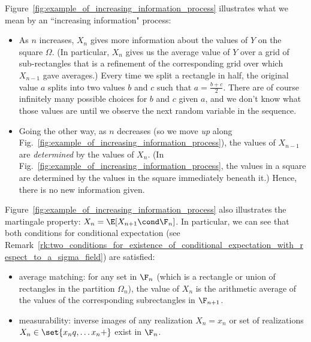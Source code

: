\documentclass{article} %
\begin{document}
\begin{remark}
Figure~\ref{fig:example_of_increasing_information_process} illustrates what we mean by an ``increasing information" process:
\begin{itemize}
\item As $n$ increases, $X_n$ gives more information about the values of $Y$ on the square $\Omega$. (In particular, $X_n$ gives us the average value of $Y$ over a grid of sub-rectangles that is a refinement of the corresponding grid over which $X_{n-1}$ gave averages.)  Every time we split a rectangle in half, the original value $a$ splits into two values $b$ and $c$ such that $a = \frac{b+c}{2}$.  There are of course infinitely many possible choices for $b$ and $c$ given $a$, and we don't know what those values are until we observe the next random variable in the sequence. 

\item Going the other way, as $n$ decreases (so we move \textit{up} along Fig.~\ref{fig:example_of_increasing_information_process}), the values of $X_{n-1}$  are \textit{determined} by the values of $X_n$. (In  Fig.~\ref{fig:example_of_increasing_information_process}, the values in a square are determined by the values in the square immediately beneath it.)    Hence, there is no new information given.  %
\end{itemize}

Figure~\ref{fig:example_of_increasing_information_process} also illustrates the martingale property: $X_n = \E[X_{n+1} \cond \F_n]$.  In particular, we can see that both conditions for conditional expectation (see Remark~\ref{rk:two_conditions_for_existence_of_conditional_expectation_with_respect_to_a_sigma_field}) are satisfied:
%
\begin{itemize}
\item average matching: for any set in $\F_n$ (which is a rectangle or union of rectangles in the partition $\Omega_n$), the value of $X_n$ is the arithmetic average of the values of the corresponding subrectangles in $\F_{n+1}$.
\item measurability: inverse images of any realization $X_n = x_n$ or set of realizations $X_n \in  \set{x_n^^1, \hdots x_n^^k}$ exist in $\F_n$.
\end{itemize}



 
 

\end{remark}
\end{document}
